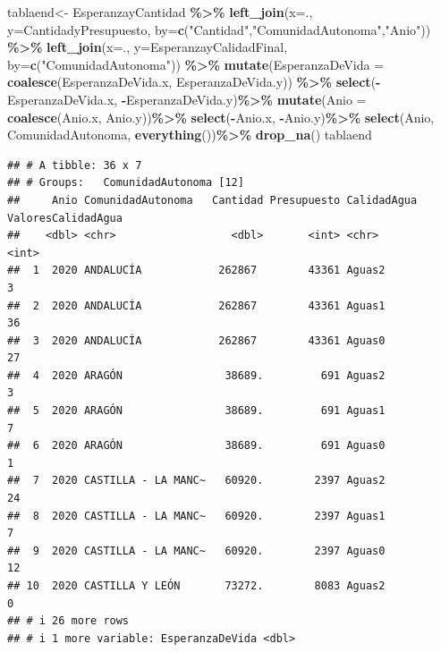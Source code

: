 \documentclass[
]{article}
\newenvironment{Shaded}{\begin{snugshade}}{\end{snugshade}}
\newcommand{\AttributeTok}[1]{\textcolor[rgb]{0.13,0.29,0.53}{#1}}
\newcommand{\FunctionTok}[1]{\textcolor[rgb]{0.13,0.29,0.53}{\textbf{#1}}}
\newcommand{\NormalTok}[1]{#1}
\newcommand{\OtherTok}[1]{\textcolor[rgb]{0.56,0.35,0.01}{#1}}
\newcommand{\SpecialCharTok}[1]{\textcolor[rgb]{0.81,0.36,0.00}{\textbf{#1}}}
\newcommand{\StringTok}[1]{\textcolor[rgb]{0.31,0.60,0.02}{#1}}
\begin{document}
\begin{Shaded}
\begin{Highlighting}[]
\NormalTok{tablaend}\OtherTok{\textless{}{-}}\NormalTok{ EsperanzayCantidad }\SpecialCharTok{\%\textgreater{}\%} 
  \FunctionTok{left\_join}\NormalTok{(}\AttributeTok{x=}\NormalTok{., }\AttributeTok{y=}\NormalTok{CantidadyPresupuesto, }\AttributeTok{by=}\FunctionTok{c}\NormalTok{(}\StringTok{"Cantidad"}\NormalTok{,}\StringTok{"ComunidadAutonoma"}\NormalTok{,}\StringTok{"Anio"}\NormalTok{)) }\SpecialCharTok{\%\textgreater{}\%}
  \FunctionTok{left\_join}\NormalTok{(}\AttributeTok{x=}\NormalTok{., }\AttributeTok{y=}\NormalTok{EsperanzayCalidadFinal, }\AttributeTok{by=}\FunctionTok{c}\NormalTok{(}\StringTok{"ComunidadAutonoma"}\NormalTok{)) }\SpecialCharTok{\%\textgreater{}\%} 
  \FunctionTok{mutate}\NormalTok{(}\AttributeTok{EsperanzaDeVida =} \FunctionTok{coalesce}\NormalTok{(EsperanzaDeVida.x, EsperanzaDeVida.y)) }\SpecialCharTok{\%\textgreater{}\%}
  \FunctionTok{select}\NormalTok{(}\SpecialCharTok{{-}}\NormalTok{EsperanzaDeVida.x, }\SpecialCharTok{{-}}\NormalTok{EsperanzaDeVida.y)}\SpecialCharTok{\%\textgreater{}\%}
  \FunctionTok{mutate}\NormalTok{(}\AttributeTok{Anio =} \FunctionTok{coalesce}\NormalTok{(Anio.x, Anio.y))}\SpecialCharTok{\%\textgreater{}\%}
  \FunctionTok{select}\NormalTok{(}\SpecialCharTok{{-}}\NormalTok{Anio.x, }\SpecialCharTok{{-}}\NormalTok{Anio.y)}\SpecialCharTok{\%\textgreater{}\%}
  \FunctionTok{select}\NormalTok{(Anio, ComunidadAutonoma, }\FunctionTok{everything}\NormalTok{())}\SpecialCharTok{\%\textgreater{}\%}
  \FunctionTok{drop\_na}\NormalTok{()}
\NormalTok{tablaend}
\end{Highlighting}
\end{Shaded}

\begin{verbatim}
## # A tibble: 36 x 7
## # Groups:   ComunidadAutonoma [12]
##     Anio ComunidadAutonoma   Cantidad Presupuesto CalidadAgua ValoresCalidadAgua
##    <dbl> <chr>                  <dbl>       <int> <chr>                    <int>
##  1  2020 ANDALUCÍA            262867        43361 Aguas2                       3
##  2  2020 ANDALUCÍA            262867        43361 Aguas1                      36
##  3  2020 ANDALUCÍA            262867        43361 Aguas0                      27
##  4  2020 ARAGÓN                38689.         691 Aguas2                       3
##  5  2020 ARAGÓN                38689.         691 Aguas1                       7
##  6  2020 ARAGÓN                38689.         691 Aguas0                       1
##  7  2020 CASTILLA - LA MANC~   60920.        2397 Aguas2                      24
##  8  2020 CASTILLA - LA MANC~   60920.        2397 Aguas1                       7
##  9  2020 CASTILLA - LA MANC~   60920.        2397 Aguas0                      12
## 10  2020 CASTILLA Y LEÓN       73272.        8083 Aguas2                       0
## # i 26 more rows
## # i 1 more variable: EsperanzaDeVida <dbl>
\end{verbatim}
\end{document}
